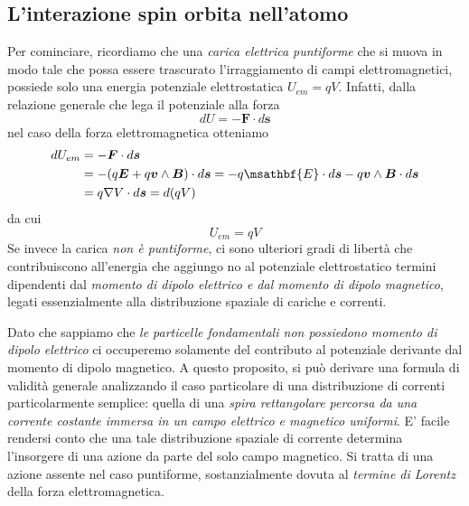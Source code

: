 \subsection{L'interazione spin orbita nell'atomo}\label{sec:spin-orbita-atomo}
Per cominciare, ricordiamo che una \emph{carica elettrica puntiforme} che si muova in modo tale che possa essere trascurato l’irraggiamento di campi elettromagnetici, possiede solo una energia potenziale elettrostatica $U_{em} = qV$. Infatti, dalla relazione generale che lega il potenziale alla forza
\[
dU = - \bm{F} \cdot d \bm{s}
\]
nel caso della forza elettromagnetica otteniamo
\begin{align*}
	dU_{em} &= - \bm{F} \cdot d \bm{s} \\
	& = - (q \bm{E} + q \bm{v} \wedge \bm{B}) \cdot d \bm{s}
	= - q \msathbf{E} \cdot d \bm{s} - q \bm{v} \wedge \bm{B} \cdot d \bm{s} \\
	& = q \nabla V \cdot d \bm{s} = d(qV)
\end{align*}
da cui
\begin{equation}
	U_{em} = qV
	\label{eq:potential-energy-electrostatic}
\end{equation}
Se invece la carica \emph{non è puntiforme}, ci sono ulteriori gradi di libertà che contribuiscono all’energia che aggiungo no al potenziale elettrostatico termini dipendenti dal \emph{momento di dipolo elettrico e dal momento di dipolo magnetico}, legati essenzialmente alla distribuzione spaziale di cariche e correnti.

Dato che sappiamo che \emph{le particelle fondamentali non possiedono momento di dipolo elettrico} ci occuperemo solamente del contributo al potenziale derivante dal momento di dipolo magnetico.
A questo proposito, si può derivare una formula di validità generale analizzando il caso particolare di una distribuzione di correnti particolarmente semplice: quella di una \emph{spira rettangolare percorsa da una corrente costante immersa in un campo elettrico e magnetico uniformi}. E’ facile rendersi conto che una tale distribuzione spaziale di corrente determina l’insorgere di una azione da parte del solo campo magnetico. Si tratta di una azione assente nel caso puntiforme, sostanzialmente dovuta al \emph{termine di Lorentz} della forza elettromagnetica.

